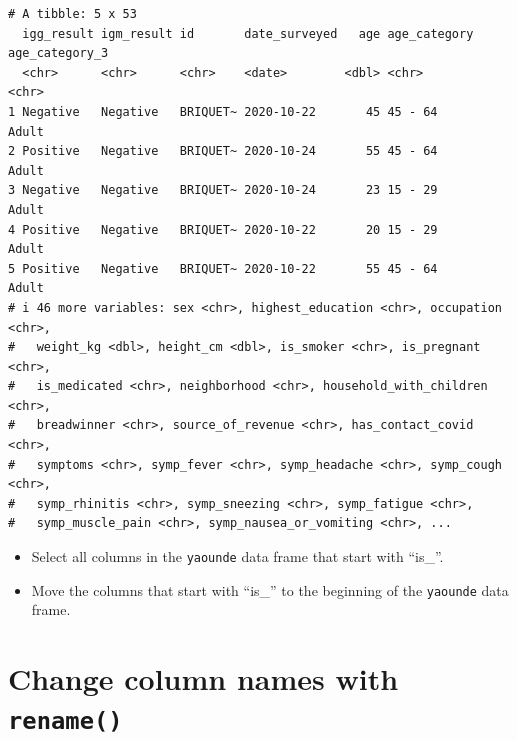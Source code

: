 \documentclass[
  letterpaper,
  DIV=11,
  numbers=noendperiod]{scrreprt}
\providecommand{\tightlist}{%
  \setlength{\itemsep}{0pt}\setlength{\parskip}{0pt}}\usepackage{longtable,booktabs,array}
\begin{document}
\begin{verbatim}
# A tibble: 5 x 53
  igg_result igm_result id       date_surveyed   age age_category age_category_3
  <chr>      <chr>      <chr>    <date>        <dbl> <chr>        <chr>         
1 Negative   Negative   BRIQUET~ 2020-10-22       45 45 - 64      Adult         
2 Positive   Negative   BRIQUET~ 2020-10-24       55 45 - 64      Adult         
3 Negative   Negative   BRIQUET~ 2020-10-24       23 15 - 29      Adult         
4 Positive   Negative   BRIQUET~ 2020-10-22       20 15 - 29      Adult         
5 Positive   Negative   BRIQUET~ 2020-10-22       55 45 - 64      Adult         
# i 46 more variables: sex <chr>, highest_education <chr>, occupation <chr>,
#   weight_kg <dbl>, height_cm <dbl>, is_smoker <chr>, is_pregnant <chr>,
#   is_medicated <chr>, neighborhood <chr>, household_with_children <chr>,
#   breadwinner <chr>, source_of_revenue <chr>, has_contact_covid <chr>,
#   symptoms <chr>, symp_fever <chr>, symp_headache <chr>, symp_cough <chr>,
#   symp_rhinitis <chr>, symp_sneezing <chr>, symp_fatigue <chr>,
#   symp_muscle_pain <chr>, symp_nausea_or_vomiting <chr>, ...
\end{verbatim}

\begin{tcolorbox}[enhanced jigsaw, title=\textcolor{quarto-callout-tip-color}{\faLightbulb}\hspace{0.5em}{Practice}, colbacktitle=quarto-callout-tip-color!10!white, leftrule=.75mm, arc=.35mm, opacityback=0, bottomrule=.15mm, rightrule=.15mm, toptitle=1mm, breakable, toprule=.15mm, colback=white, coltitle=black, colframe=quarto-callout-tip-color-frame, bottomtitle=1mm, titlerule=0mm, left=2mm, opacitybacktitle=0.6]

\begin{itemize}
\tightlist
\item
  Select all columns in the \texttt{yaounde} data frame that start with
  ``is\_''.
\end{itemize}

\begin{itemize}
\tightlist
\item
  Move the columns that start with ``is\_'' to the beginning of the
  \texttt{yaounde} data frame.
\end{itemize}

\end{tcolorbox}

\section{\texorpdfstring{Change column names with
\texttt{rename()}}{Change column names with rename()}}\label{change-column-names-with-rename}
\end{document}
